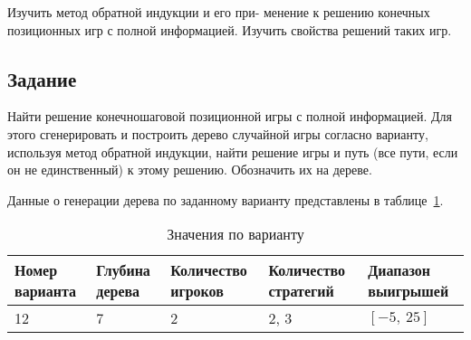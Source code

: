 
Изучить метод обратной индукции и его при- менение к решению конечных позиционных игр с полной
информацией. Изучить свойства решений таких игр.

\subsection*{Задание}

Найти решение конечношаговой позиционной игры с полной информацией. Для этого сгенерировать и
построить дерево случайной игры согласно варианту, используя метод обратной индукции, найти
решение игры и путь (все пути, если он не единственный) к этому решению. Обозначить их на дереве.

Данные о генерации дерева по заданному варианту представлены в таблице~\ref{tab:tab01}.

\begin{table}[h]
\centering
\caption{Значения по варианту}
\begin{tabularx}{\textwidth}{|X|X|X|X|X|} \hline
Номер варианта & Глубина дерева & Количество игроков & Количество стратегий & Диапазон выигрышей \\ \hline
12 & 7 & 2 & 2, 3 & \([-5,\ 25]\) \\ \hline
\end{tabularx}
\label{tab:tab01}
\end{table}
